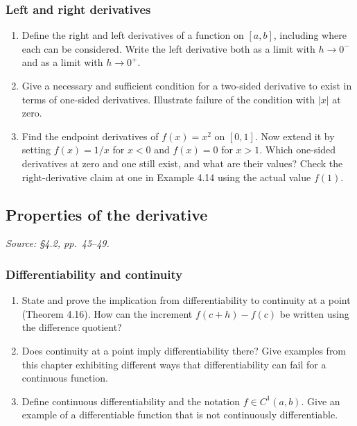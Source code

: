 \subsubsection*{Left and right derivatives}
\begin{enumerate}[resume]
  \item Define the right and left derivatives of a function on
    \([a,b]\), including where each can be considered.
    Write the left derivative both as a limit with \(h\to0^-\)
    and as a limit with \(h\to0^+\).

  \item Give a necessary and sufficient condition for a two-sided
    derivative to exist in terms of one-sided derivatives.
    Illustrate failure of the condition with \(|x|\) at zero.

  \item Find the endpoint derivatives of \(f(x)=x^2\) on \([0,1]\).
    Now extend it by setting \(f(x)=1/x\) for \(x<0\) and
    \(f(x)=0\) for \(x>1\). Which one-sided derivatives at zero
    and one still exist, and what are their values?
    Check the right-derivative claim at one in Example 4.14 using
    the actual value \(f(1)\).
\end{enumerate}

\subsection{Properties of the derivative}
\textit{Source: \S4.2, pp.~45--49.}

\subsubsection*{Differentiability and continuity}
\begin{enumerate}[resume]
  \item State and prove the implication from differentiability to
    continuity at a point (Theorem 4.16). How can the increment
    \(f(c+h)-f(c)\) be written using the difference quotient?

  \item Does continuity at a point imply differentiability there?
    Give examples from this chapter exhibiting different ways that
    differentiability can fail for a continuous function.

  \item Define continuous differentiability and the notation
    \(f\in C^1(a,b)\). Give an example of a differentiable
    function that is not continuously differentiable.
\end{enumerate}

